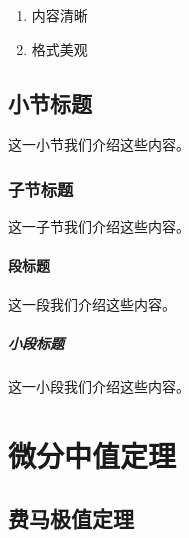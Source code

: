 \documentclass[printbox]{BHCexam}
\begin{document}
\AddEnumerateCounter{\chinese}{\chinese}{}

\begin{enumerate}[label={\chinese*、},labelsep=0pt]

  \item 内容清晰

  \item 格式美观

\end{enumerate}


\subsection{小节标题}这一小节我们介绍这些内容。
\subsubsection{子节标题}这一子节我们介绍这些内容。
\paragraph{段标题}这一段我们介绍这些内容。
\subparagraph{小段标题}这一小段我们介绍这些内容。

\section{微分中值定理}

\subsection{费马极值定理}

\notice
\end{document}
